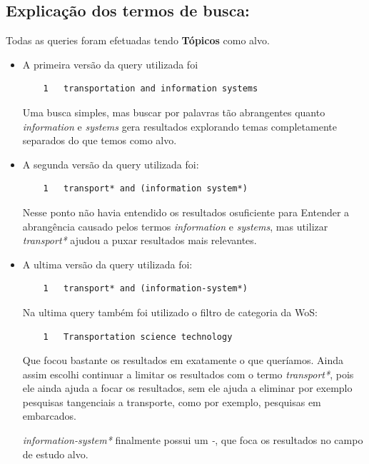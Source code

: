 \subsection{Explicação dos termos de busca:}
Todas as queries foram efetuadas tendo \textbf{Tópicos} como alvo.
\begin{itemize}

\item A primeira versão da query utilizada foi

\begin{verbatim}
    1   transportation and information systems
\end{verbatim}

Uma busca simples, mas buscar por palavras tão abrangentes
quanto
\textit{information} e \textit{systems} gera resultados explorando
temas completamente separados do que temos como alvo.

\item A segunda versão da query utilizada foi:

\begin{verbatim}
    1   transport* and (information system*)
\end{verbatim}


Nesse ponto não havia entendido os resultados osuficiente para
Entender \newline a abrangência causado pelos termos \textit{information} e
\textit{systems}, mas utilizar \textit{transport*} ajudou a puxar
resultados mais relevantes.


\item A ultima versão da query utilizada foi:

\begin{verbatim}
    1   transport* and (information-system*)
\end{verbatim}


Na ultima query também foi utilizado o filtro de categoria da WoS:
\begin{verbatim}
    1   Transportation science technology
\end{verbatim}

Que focou bastante os resultados em exatamente o que queríamos.
Ainda assim escolhi continuar a limitar os resultados com o termo \textit{transport*}, pois ele ainda ajuda a focar os resultados, sem ele ajuda a eliminar por exemplo pesquisas tangenciais a transporte, como por exemplo, pesquisas em embarcados.

\textit{information-system*} finalmente possui um \emph{-}, que foca os resultados no campo de estudo alvo.


\end{itemize}
